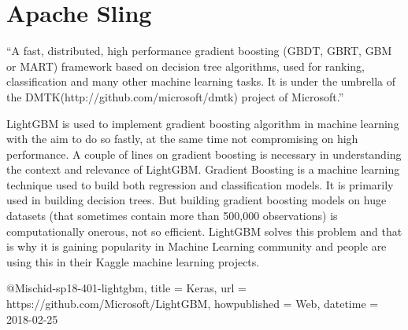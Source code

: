 \section{Apache Sling} 

“A fast, distributed, high performance gradient boosting (GBDT, GBRT, GBM or
MART) framework based on decision tree algorithms, used for ranking,
classification and many other machine learning tasks. It is under the umbrella
of the DMTK(http://github.com/microsoft/dmtk) project of Microsoft.” \cite{hid-
sp18-401-lightgbm} 

LightGBM is used to implement gradient boosting algorithm in
machine learning with the aim to do so fastly, at the same time not compromising
on high performance.  A couple of lines on gradient boosting is necessary in
understanding the context and relevance of LightGBM. Gradient Boosting is a
machine learning technique used to build both regression and classification
models. It is primarily used in building decision trees. But building gradient
boosting models on huge datasets (that sometimes contain more than 500,000
observations) is computationally onerous, not so efficient.  LightGBM solves
this problem and that is why it is gaining popularity in Machine Learning
community and people are using this in their Kaggle machine learning projects.

@Misc{hid-sp18-401-lightgbm, 
title = {Keras}, 
url = {https://github.com/Microsoft/LightGBM}, 
howpublished = {Web}, 
datetime = {2018-02-25} }


